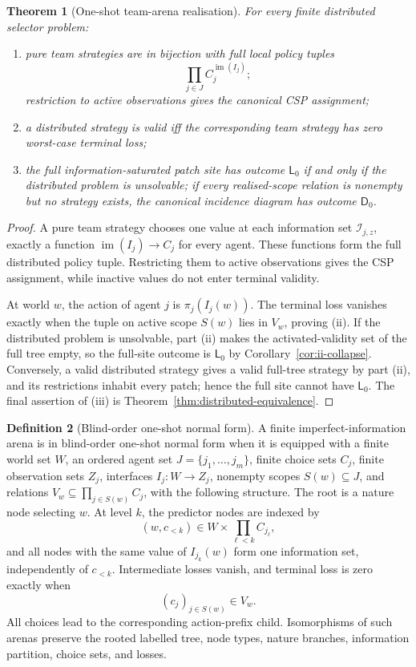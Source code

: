 \documentclass[11pt]{article}
\theoremstyle{plain}
\newtheorem{theorem}{Theorem}[section]
\theoremstyle{definition}
\newtheorem{definition}[theorem]{Definition}
\theoremstyle{remark}
\newcommand{\im}{\operatorname{im}}
\begin{document}
\begin{theorem}[One-shot team-arena realisation]\label{thm:oneshot}
For every finite distributed selector problem:
\begin{enumerate}[label=(\roman*)]
\item pure team strategies are in bijection with full local policy tuples
\[
\prod_{j\in J}C_j^{\im(I_j)};
\]
restriction to active observations gives the canonical CSP assignment;
\item a distributed strategy is valid iff the corresponding team strategy has
zero worst-case terminal loss;
\item the full information-saturated patch site has outcome $\mathsf L_0$ if
and only if the distributed problem is unsolvable; if every realised-scope
relation is nonempty but no strategy exists, the canonical incidence diagram
has outcome $\mathsf D_0$.
\end{enumerate}
\end{theorem}

\begin{proof}
A pure team strategy chooses one value at each information set
$\mathcal I_{j,z}$, exactly a function $\im(I_j)\to C_j$ for every agent. These
functions form the full distributed policy tuple. Restricting them to active
observations gives the CSP assignment, while inactive values do not enter
terminal validity.

At world $w$, the action of agent $j$ is $\pi_j(I_j(w))$. The terminal loss
vanishes exactly when the tuple on active scope $S(w)$ lies in $V_w$, proving
(ii). If the distributed problem is unsolvable, part (ii) makes the activated-validity
set of the full tree empty, so the full-site outcome is $\mathsf L_0$ by
Corollary~\ref{cor:ii-collapse}. Conversely, a valid distributed strategy gives
a valid full-tree strategy by part (ii), and its restrictions inhabit every
patch; hence the full site cannot have $\mathsf L_0$. The final assertion of
(iii) is Theorem~\ref{thm:distributed-equivalence}.
\end{proof}


\begin{definition}[Blind-order one-shot normal form]
\label{def:blind-one-shot}
A finite imperfect-information arena is in blind-order one-shot normal form when
it is equipped with a finite world set $W$, an ordered agent set
$J=\{j_1,\ldots,j_m\}$, finite choice sets $C_j$, finite observation sets
$Z_j$, interfaces $I_j:W\to Z_j$, nonempty scopes $S(w)\subseteq J$, and
relations $V_w\subseteq\prod_{j\in S(w)}C_j$, with the following structure.
The root is a nature node selecting $w$. At level $k$, the predictor nodes are
indexed by
\[
(w,c_{<k})\in W\times\prod_{\ell<k}C_{j_\ell},
\]
and all nodes with the same value of $I_{j_k}(w)$ form one information set,
independently of $c_{<k}$. Intermediate losses vanish, and terminal loss is zero
exactly when
\[
(c_j)_{j\in S(w)}\in V_w.
\]
All choices lead to the corresponding action-prefix child. Isomorphisms of such
arenas preserve the rooted labelled tree, node types, nature branches,
information partition, choice sets, and losses.
\end{definition}
\end{document}
